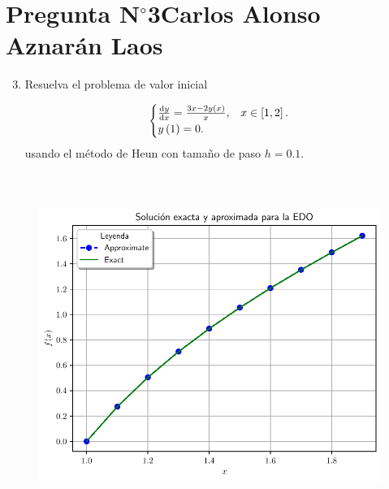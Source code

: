 \section{Pregunta N$^{\circ}$3\qquad Carlos Alonso Aznarán Laos}



\begin{frame}[fragile]
    \begin{enumerate}\setcounter{enumi}{2}
        \item

              Resuelva el problema de valor inicial

              \begin{equation*}
                  \begin{cases}
                      \diff{y}{x}=\frac{3x-2y\left(x\right)}{x},
                       & x\in\left[1,2\right]. \\
                      y\left(1\right)=0.
                       &
                  \end{cases}
              \end{equation*}
              usando el método de Heun con tamaño de paso $h=0.1$.
    \end{enumerate}

    \begin{solution}
        \begin{columns}
            \begin{column}{0.38\textwidth}
                \inputminted[fontsize=\tiny,firstline=10,lastline=24]{python}{p3.py}
            \end{column}
            \begin{column}{0.58\textwidth}
                \inputminted[fontsize=\tiny,firstline=27,lastline=30]{python}{p3.py}
            \end{column}
        \end{columns}
    \end{solution}
\end{frame}

\begin{frame}
    \begin{solution}
        \begin{figure}[ht!]
            \centering
            \includegraphics[width=0.7\paperwidth]{p3}
        \end{figure}
    \end{solution}
\end{frame}